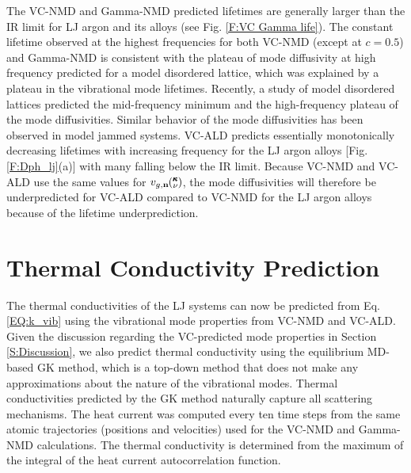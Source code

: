 The VC-NMD and Gamma-NMD predicted lifetimes are generally larger 
than the IR limit  
for LJ argon and its alloys (see Fig. \ref{F:VC Gamma life}). 
The constant lifetime observed at the highest frequencies  
for both VC-NMD (except at $c=0.5$) and Gamma-NMD is 
consistent with the plateau of mode diffusivity at high 
frequency predicted for a model disordered lattice, 
which was explained by a plateau in the vibrational mode lifetimes.
\cite{sheng_heat_1991} Recently, a study of model disordered lattices 
predicted the mid-frequency minimum and the high-frequency plateau  
of the mode diffusivities.\cite{beltukov_ioffe-regel_2013} 
Similar behavior of the mode diffusivities has been observed in 
model jammed systems.\cite{xu_energy_2009,vitelli_heat_2010} 
VC-ALD predicts essentially monotonically 
decreasing lifetimes with increasing frequency for the LJ argon 
alloys [Fig. \ref{F:Dph_lj}(a)] with many falling below the IR limit. 
Because VC-NMD and VC-ALD use the same values for 
$v_{g,\mathbf{n}}\mspace{-4.0mu}\left(\mspace{-8.0mu} \begin{smallmatrix}&\pmb{\kappa} \\&\nu\end{smallmatrix} \mspace{-3.0mu}\right)$, the 
mode diffusivities will therefore be underpredicted for 
VC-ALD compared to VC-NMD for the LJ argon alloys because of the 
lifetime underprediction. 



\section{\label{S:Thermal Conductivity}Thermal Conductivity Prediction}

The thermal conductivities of the LJ systems can now be predicted from 
Eq. \eqref{EQ:k_vib} using the vibrational mode properties 
from VC-NMD and VC-ALD. Given the discussion regarding the 
VC-predicted mode properties in Section \ref{S:Discussion}, 
we also predict thermal conductivity using the equilibrium 
MD-based GK method, which is a top-down method that does not make any 
approximations about the nature of the vibrational modes. 
Thermal conductivities predicted by the GK method 
naturally capture all scattering mechanisms.
\cite{landry_complex_2008,he_thermal_2011,he_lattice_2012} 
The heat current was computed every ten time steps from the same atomic 
trajectories (positions and velocities) used for the VC-NMD and 
Gamma-NMD calculations.  The thermal conductivity is 
determined from the maximum of the integral of the heat 
current autocorrelation function.

